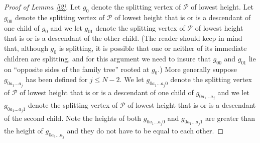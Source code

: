 \documentclass[12pt]{amsart}
\numberwithin{equation}{section}
\theoremstyle{definition}
\theoremstyle{remark}
\begin{document}
\begin{proof}[Proof of Lemma \ref{l2}]

Let $g_0$ denote the splitting vertex of $\mathscr{P}$ of lowest height.  Let $g_{00}$ denote the splitting vertex of $\mathscr{P}$ of lowest height that is or is a descendant of one child of $g_{0}$ and we let  $g_{01}$ denote the splitting vertex of $\mathscr{P}$ of lowest height that is or is a descendant of the other child.    (The reader should keep in mind that, although $g_0$ is splitting, it is possible that one or neither of its immediate children are splitting, and for this argument we need to insure that $g_{00}$ and  $g_{01}$ lie on ``opposite sides of the family tree'' rooted at $g_0$.)
More generally suppose $g_{0a_1\ldots a_j}$ has been defined for $j \leq N-2$.  We let $g_{0a_1\ldots a_j 0}$ denote the splitting vertex of $\mathscr{P}$ of lowest height that is or is a descendant of one child  of $g_{0a_1\ldots a_j}$  and we let $g_{0a_1\ldots a_j 1}$ denote the splitting vertex of $\mathscr{P}$ of lowest height that is or is a descendant of the second child.  Note the heights of both $g_{0a_1\ldots a_j 0}$ and $g_{0a_1\ldots a_j 1}$ are greater than  the height of  $g_{0a_1\ldots a_j}$  and they do not have to be equal to each other.



\end{proof}
\end{document}
